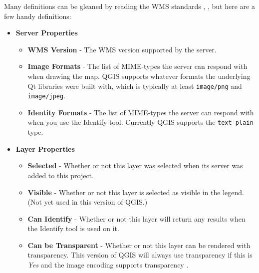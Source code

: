 Many definitions can be gleaned by reading the WMS
standards \cite{OGCWMS010101web}, \cite{OGCWMS010300web}, but
here are a few handy definitions:

\begin{itemize}
\item \textbf{Server Properties}

\begin{itemize}
\item \textbf{WMS Version}      - The WMS version supported by the server.

\item \textbf{Image Formats}    - The list of MIME-types the server can respond with when
                                  drawing the map.  QGIS supports whatever formats
                                  the underlying Qt libraries were built with, which
                                  is typically at least \texttt{image/png} 
                                  and \texttt{image/jpeg}.

\item \textbf{Identity Formats} - The list of MIME-types the server can respond with when
                                  you use the Identify tool.  Currently QGIS supports
                                  the \texttt{text-plain} type.

\end{itemize}

\item \textbf{Layer Properties}

\begin{itemize}
\item \textbf{Selected}         - Whether or not this layer was selected when its                                                                        server was added to this project.

\item \textbf{Visible}          - Whether or not this layer is selected as visible
                                  in the legend.  (Not yet used in this version of QGIS.)

\item \textbf{Can Identify}     - Whether or not this layer will return any results
                                  when the Identify tool is used on it.

\item \textbf{Can be Transparent} - Whether or not this layer can be rendered with transparency.
                                    This version of 
                                    QGIS will always use transparency if this is \textsl{Yes}
                                    and the image encoding supports transparency
                                    .


\end{itemize}
\end{itemize}
